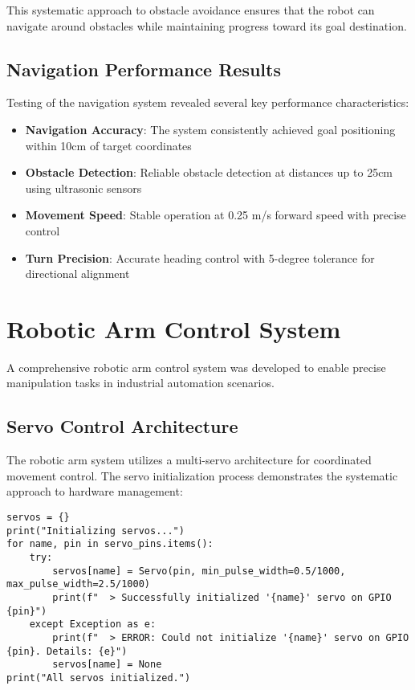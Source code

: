 \documentclass{book}
\begin{document}
\par\noindent This systematic approach to obstacle avoidance ensures that the robot can navigate around obstacles while maintaining progress toward its goal destination.

\subsection{Navigation Performance Results}

\par\noindent Testing of the navigation system revealed several key performance characteristics:

\begin{itemize}
\item \textbf{Navigation Accuracy}: The system consistently achieved goal positioning within 10cm of target coordinates
\item \textbf{Obstacle Detection}: Reliable obstacle detection at distances up to 25cm using ultrasonic sensors
\item \textbf{Movement Speed}: Stable operation at 0.25 m/s forward speed with precise control
\item \textbf{Turn Precision}: Accurate heading control with 5-degree tolerance for directional alignment
\end{itemize}

\section{Robotic Arm Control System}

\par\noindent A comprehensive robotic arm control system was developed to enable precise manipulation tasks in industrial automation scenarios.

\subsection{Servo Control Architecture}

\par\noindent The robotic arm system utilizes a multi-servo architecture for coordinated movement control. The servo initialization process demonstrates the systematic approach to hardware management:

\begin{lstlisting}[style=pythonstyle, caption={Servo Initialization System}]
servos = {}
print("Initializing servos...")
for name, pin in servo_pins.items():
    try:
        servos[name] = Servo(pin, min_pulse_width=0.5/1000, max_pulse_width=2.5/1000)
        print(f"  > Successfully initialized '{name}' servo on GPIO {pin}")
    except Exception as e:
        print(f"  > ERROR: Could not initialize '{name}' servo on GPIO {pin}. Details: {e}")
        servos[name] = None
print("All servos initialized.")
\end{lstlisting}
\end{document}
